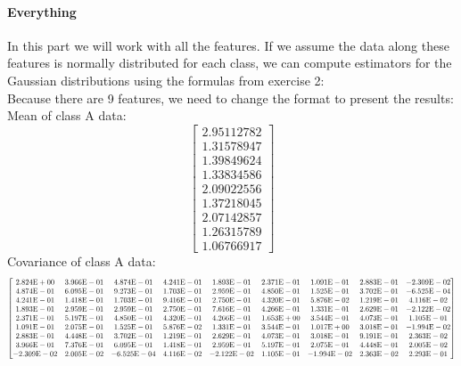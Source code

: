\documentclass[a4paper, 10pt]{article}
\newcommand\scalemath[2]{\scalebox{#1}{\mbox{\ensuremath{\displaystyle #2}}}}
\begin{document}
\paragraph{Everything}
In this part we will work with all the features. 
If we assume the data along these features is normally distributed for each class, we can compute
estimators for the Gaussian distributions using the formulas from exercise 2:
\\
Because there are 9 features, we need to change the format to present the results:
\\
Mean of class A data:
$$
\begin{bmatrix}
    2.95112782\\
    1.31578947\\
    1.39849624\\
    1.33834586\\
    2.09022556\\
    1.37218045\\
    2.07142857\\
    1.26315789\\
    1.06766917
\end{bmatrix}
$$
Covariance of class A data:
$$
\scalemath{0.7}{
\begin{bmatrix}
    2.824\text{E}+00 & 3.966\text{E}-01 & 4.874\text{E}-01 & 4.241\text{E}-01 & 1.893\text{E}-01 & 2.371\text{E}-01 & 1.091\text{E}-01 & 2.883\text{E}-01 & -2.309\text{E}-02\\
    4.874\text{E}-01 & 6.095\text{E}-01 & 9.273\text{E}-01 & 1.703\text{E}-01 & 2.959\text{E}-01 & 4.850\text{E}-01 & 1.525\text{E}-01 & 3.702\text{E}-01 & -6.525\text{E}-04\\  
    4.241\text{E}-01 & 1.418\text{E}-01 & 1.703\text{E}-01 & 9.416\text{E}-01 & 2.750\text{E}-01 & 4.320\text{E}-01 & 5.876\text{E}-02 & 1.219\text{E}-01 & 4.116\text{E}-02\\
    1.893\text{E}-01 & 2.959\text{E}-01 & 2.959\text{E}-01 & 2.750\text{E}-01 & 7.616\text{E}-01 & 4.266\text{E}-01 & 1.331\text{E}-01 & 2.629\text{E}-01 & -2.122\text{E}-02\\
    2.371\text{E}-01 & 5.197\text{E}-01 & 4.850\text{E}-01 & 4.320\text{E}-01 & 4.266\text{E}-01 & 1.653\text{E}+00 & 3.544\text{E}-01 & 4.073\text{E}-01 & 1.105\text{E}-01\\
    1.091\text{E}-01 & 2.075\text{E}-01 & 1.525\text{E}-01 & 5.876\text{E}-02 & 1.331\text{E}-01 & 3.544\text{E}-01 & 1.017\text{E}+00 & 3.018\text{E}-01 & -1.994\text{E}-02\\
    2.883\text{E}-01 & 4.448\text{E}-01 & 3.702\text{E}-01 & 1.219\text{E}-01 & 2.629\text{E}-01 & 4.073\text{E}-01 & 3.018\text{E}-01 & 9.191\text{E}-01 & 2.363\text{E}-02\\
    3.966\text{E}-01 & 7.376\text{E}-01 & 6.095\text{E}-01 & 1.418\text{E}-01 & 2.959\text{E}-01 & 5.197\text{E}-01 & 2.075\text{E}-01 & 4.448\text{E}-01 & 2.005\text{E}-02\\
    -2.309\text{E}-02 & 2.005\text{E}-02 & -6.525\text{E}-04 & 4.116\text{E}-02 & -2.122\text{E}-02 & 1.105\text{E}-01 & -1.994\text{E}-02 & 2.363\text{E}-02 & 2.293\text{E}-01
\end{bmatrix}}
$$
\end{document}
